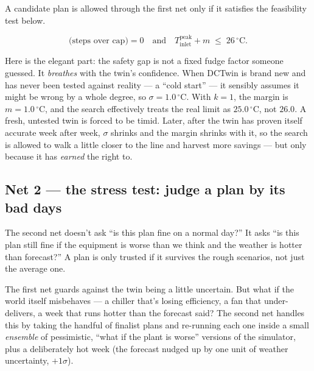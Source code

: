 A candidate plan is allowed through the first net only if it satisfies the feasibility test below.

\begin{equation}\label{eq:feasible}
\text{(steps over cap)} = 0 \quad\text{and}\quad T_{\text{inlet}}^{\text{peak}} + m \;\le\; 26\,^{\circ}\text{C}.
\end{equation}

Here is the elegant part: the safety gap is not a fixed fudge factor someone guessed. It \emph{breathes} with the twin's confidence. When DCTwin is brand new and has never been tested against reality --- a ``cold start'' --- it sensibly assumes it might be wrong by a whole degree, so $\sigma = 1.0\,^{\circ}$C. With $k=1$, the margin is $m = 1.0\,^{\circ}$C, and the search effectively treats the real limit as $25.0\,^{\circ}$C, not $26.0$. A fresh, untested twin is forced to be timid. Later, after the twin has proven itself accurate week after week, $\sigma$ shrinks and the margin shrinks with it, so the search is allowed to walk a little closer to the line and harvest more savings --- but only because it has \emph{earned} the right to.

\subsection{Net 2 --- the stress test: judge a plan by its bad days}

\begin{keyidea}
The second net doesn't ask ``is this plan fine on a normal day?'' It asks ``is this plan still fine if the equipment is worse than we think and the weather is hotter than forecast?'' A plan is only trusted if it survives the rough scenarios, not just the average one.
\end{keyidea}

The first net guards against the twin being a little uncertain. But what if the world itself misbehaves --- a chiller that's losing efficiency, a fan that under-delivers, a week that runs hotter than the forecast said? The second net handles this by taking the handful of finalist plans and re-running each one inside a small \emph{ensemble} of pessimistic, ``what if the plant is worse'' versions of the simulator, plus a deliberately hot week (the forecast nudged up by one unit of weather uncertainty, $+1\sigma$).

